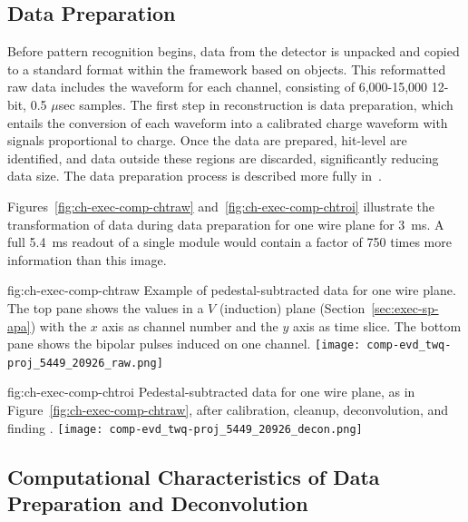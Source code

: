 \subsection{Data Preparation}

Before pattern recognition begins, data from the  detector is
unpacked and copied to a standard format within the  framework based on  objects. 
This reformatted raw data includes the waveform for each channel, consisting of 6,000-15,000  12-bit, 0.5 $\mu$sec samples. 
The first step in reconstruction is data preparation, which entails the conversion of each  waveform into a calibrated charge waveform with
signals proportional to charge. Once the data are prepared, hit-level  are identified, and data outside these regions are discarded, significantly reducing data size. The data preparation process is described more fully in~\cite{bib:docdb12349}. 

Figures~\ref{fig:ch-exec-comp-chtraw} and~\ref{fig:ch-exec-comp-chtroi} illustrate the transformation of  data  during data preparation %
for one wire plane for \SI{3}{ms}.  A full \SI{5.4}{ms} readout of a single \nominalmodsize module would contain a factor of 750 times %
more information than this image.
\begin{dunefigure}
{fig:ch-exec-comp-chtraw}
{Example of pedestal-subtracted data for one   wire plane.  The top pane shows the  values in a $V$ (induction) plane (Section~\ref{sec:exec-sp-apa}) with the $x$ axis as channel number and the $y$ axis as time slice. The bottom pane shows the bipolar pulses induced on one channel.}
\texttt{[image: comp-evd\_twq-proj\_5449\_20926\_raw.png]}
\end{dunefigure}


\begin{dunefigure}
{fig:ch-exec-comp-chtroi}
{Pedestal-subtracted data for one  wire plane, as in Figure~\ref{fig:ch-exec-comp-chtraw}, after calibration, cleanup, deconvolution, and finding .}
 \texttt{[image: comp-evd\_twq-proj\_5449\_20926\_decon.png]}
\end{dunefigure}


\subsection{Computational Characteristics of Data Preparation and Deconvolution }

